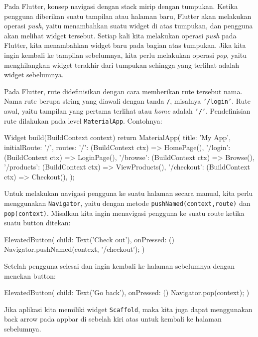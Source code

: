 \documentclass[a4paper,11pt]{article} %
\newcommand{\txtinline}[1]{\texttt{#1}}
\begin{document}
Pada Flutter, konsep navigasi dengan stack mirip dengan tumpukan. Ketika pengguna
diberikan suatu tampilan atau halaman baru, Flutter akan melakukan operasi \textit{push},
yaitu menambahkan suatu widget di atas tumpukan, dan pengguna akan melihat widget tersebut.
Setiap kali kita melakukan operasi \textit{push} pada Flutter, kita menambahkan widget baru pada
bagian atas tumpukan. Jika kita ingin kembali ke tampilan sebelumnya, kita perlu
melakukan operasi \textit{pop}, yaitu menghilangkan widget terakhir dari tumpukan sehingga
yang terlihat adalah widget sebelumnya.

Pada Flutter, rute didefinisikan dengan cara memberikan rute tersebut nama. Nama rute
berupa string yang diawali dengan tanda \txtinline{/}, misalnya \txtinline{'/login'}.
Rute awal, yaitu tampilan yang pertama terlihat atau \textit{home} adalah \txtinline{'/'}.
Pendefinisian rute dilakukan pada level \txtinline{MaterialApp}. Contohnya:
\begin{dartcode}
Widget build(BuildContext context) {
  return MaterialApp(
    title: 'My App',
    initialRoute: '/',
    routes: {
      '/': (BuildContext ctx) => HomePage(),
      '/login': (BuildContext ctx) => LoginPage(),
      '/browse': (BuildContext ctx) => Browse(),
      '/products': (BuildContext ctx) => ViewProducts(),
      '/checkout': (BuildContext ctx) => Checkout(),
    }
  );
}
\end{dartcode}

Untuk melakukan navigasi pengguna ke suatu halaman secara manual, kita perlu
menggunakan \txtinline{Navigator}, yaitu dengan metode \txtinline{pushNamed(context,route)}
dan \txtinline{pop(context)}. Misalkan kita ingin menavigasi pengguna ke suatu route
ketika suatu button ditekan:
\begin{dartcode}
ElevatedButton(
  child: Text('Check out'),
  onPressed: () {
    Navigator.pushNamed(context, '/checkout');
  }
)
\end{dartcode}
Setelah pengguna selesai dan ingin kembali ke halaman sebelumnya dengan menekan button:
\begin{dartcode}
ElevatedButton(
  child: Text('Go back'),
  onPressed: () {
    Navigator.pop(context);
  }
)
\end{dartcode}
Jika aplikasi kita memiliki widget \txtinline{Scaffold}, maka kita juga dapat menggunakan
back arrow pada appbar di sebelah kiri atas untuk kembali ke halaman sebelumnya.
\end{document}
